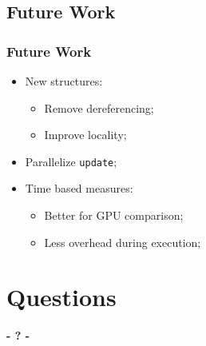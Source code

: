 \documentclass{beamer}
\begin{document}
\subsection{Future Work}
\begin{frame}
	\frametitle{Future Work}

\begin{itemize}
\item{New structures:
	\begin{itemize}
	\item{Remove dereferencing;}
	\item{Improve locality;}
	\end{itemize}
	}
\item{Parallelize \texttt{update};}
\item{Time based measures:
	\begin{itemize}
	\item{Better for GPU comparison;}
	\item{Less overhead during execution;}
	\end{itemize}
	}
\end{itemize}

\end{frame}





\section{Questions}
\begin{frame}
	\titlepage
	\begin{center}
		\Huge\bfseries
		- ? -
	\end{center}
\end{frame}
\end{document}
